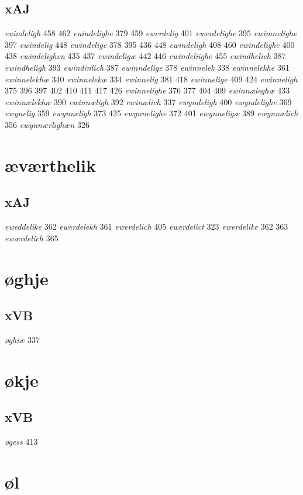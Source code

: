 \documentclass[a4paper,twocolumn]{article}
\begin{document}
\subsection{xAJ}
\label{sec:org3ecba25}
\emph{euindeligh} 458 462 \emph{euindelighe} 379 459 \emph{ewerdelig} 401 \emph{ewerdelighe} 395 \emph{ewimnelighe} 397 \emph{ewindelig} 448 \emph{ewindelige} 378 395 436 448 \emph{ewindeligh} 408 460 \emph{ewindelighe} 400 438 \emph{ewindelighen} 435 437 \emph{ewindeligæ} 442 446 \emph{ewindeliighe} 455 \emph{ewindhelich} 387 \emph{ewindheligh} 393 \emph{ewindinlich} 387 \emph{ewinndelige} 378 \emph{ewinnelek} 338 \emph{ewinnelekhe} 361 \emph{ewinnelekhæ} 340 \emph{ewinnelekæ} 334 \emph{ewinnelig} 381 418 \emph{ewinnelige} 409 424 \emph{ewinneligh} 375 396 397 402 410 411 417 426 \emph{ewinnelighe} 376 377 404 409 \emph{ewinnæleghæ} 433 \emph{ewinnælekhæ} 390 \emph{ewinnæligh} 392 \emph{ewinælich} 337 \emph{ewyndeligh} 400 \emph{ewyndelighe} 369 \emph{ewynelig} 359 \emph{ewynneligh} 373 425 \emph{ewynnelighe} 372 401 \emph{ewynneligæ} 389 \emph{ewynnælich} 356 \emph{ewynnærlighæn} 326 
\section{æværthelik}
\label{sec:org5bfe83f}
\subsection{xAJ}
\label{sec:org58e9ef9}
\emph{eweddelike} 362 \emph{ewerdelekh} 361 \emph{ewerdelich} 405 \emph{ewerdelict} 323 \emph{ewerdelike} 362 363 \emph{ewærdelich} 365 
\section{øghje}
\label{sec:orge4c01f9}
\subsection{xVB}
\label{sec:orge1da75a}
\emph{øghiæ} 337 
\section{økje}
\label{sec:org3dad20d}
\subsection{xVB}
\label{sec:orga3179b4}
\emph{øgess} 413 
\section{øl}
\label{sec:orgbc521d4}
\end{document}
